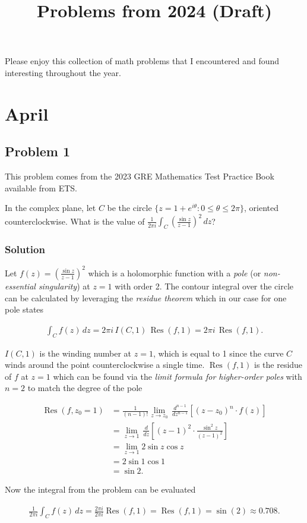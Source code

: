 \documentclass[12pt]{article}
\title{Problems from 2024 (Draft)}
\begin{document}
\maketitle

Please enjoy this collection of math problems that I encountered and found interesting throughout the year.

\setcounter{section}{3}
\section{April}

\subsection{Problem 1}

This problem comes from the 2023 GRE Mathematics Test Practice Book available from ETS.

In the complex plane, let $C$ be the circle $\{ z = 1 + e^{i\theta} : 0 \le \theta \le 2\pi\}$, oriented counterclockwise. What is the value of $\frac{1}{2 \pi i} \int_{C} \left( \frac{\sin z}{z - 1} \right)^2\,dz$?

\subsubsection*{Solution}

Let $f(z) = \left( \frac{\sin z}{z - 1} \right)^2$ which is a holomorphic function with a {\em{pole}} (or {\em{non-essential singularity}}) at $z=1$ with order 2. The contour integral over the circle can be calculated by leveraging the {\em{residue theorem}} which in our case for one pole states

\begin{align}
  \int_{C} f(z)\, dz = 2 \pi i \, I(C,1) \, \operatorname{Res}(f,1) = 2 \pi i \, \operatorname{Res}(f,1).
\end{align}

$I(C,1)$ is the winding number at $z=1$, which is equal to 1 since the curve $C$ winds around the point counterclockwise a single time. $\operatorname{Res}(f,1)$ is the residue of $f$ at $z=1$ which can be found via the {\em{limit formula for higher-order poles}} with $n = 2$ to match the degree of the pole

\begin{align}
  \operatorname{Res}(f, z_0 = 1)
    &= \frac{1}{(n-1)!} \lim_{z \rightarrow z_0} \, \frac{d^{n-1}}{dz^{n-1}} \left[ \left(z - z_0\right)^n \cdot f(z) \right] \\
    &= \lim_{z \rightarrow 1} \, \frac{d}{dz} \left[ \left(z - 1\right)^2 \cdot \frac{\sin^2 z}{(z-1)^2} \right] \\
    &= \lim_{z \rightarrow 1} 2 \sin z \cos z \\
    &= 2 \sin 1 \cos 1 \\
    &= \sin 2.
\end{align}

Now the integral from the problem can be evaluated

\begin{align}
  \frac{1}{2 \pi i} \int_{C} f(z)\,dz
    = \frac{2 \pi i}{2 \pi i} \operatorname{Res}(f,1)
    = \operatorname{Res}(f,1)
    = \sin(2)
    \approx 0.708.
\end{align}
\end{document}
